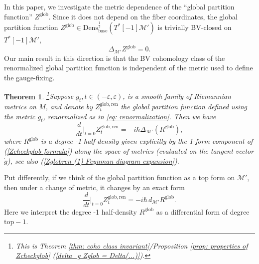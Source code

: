 \documentclass[11pt,a4paper]{amsart}
\theoremstyle{plain} %
\newtheorem{thm}{Theorem}[section]
\theoremstyle{definition}
\theoremstyle{remark}
\newtheorem{rem}[thm]{Remark}
\newcommand{\mr}{\mathrm}
\newcommand{\M}{\mathcal{M}}
\begin{document}
In this paper, we investigate the metric dependence of the ``global partition function'' $Z^\mr{glob}$.  
Since it does not depend on the fiber coordinates, the global partition function $Z^\mr{glob} \in \mr{Dens}^{\frac12}_\mr{base}(T^*[-1]\M')$ is trivially BV-closed on $T^*[-1]\M'$, 
\begin{equation}
    \Delta_{\M'}Z^\mr{glob} = 0.
\end{equation}
Our main result in this direction is that the  BV cohomology class of the renormalized global partition function is independent of the metric used to define the gauge-fixing. 
\begin{thm}\footnote{
This is Theorem \ref{thm: coho class invariant}/Proposition \ref{prop: properties of Zcheckglob} (\ref{delta_g Zglob = Delta(...)}).
}\label{thm:metric dependence intro}
Suppose $g_t, t\in (-\varepsilon,\varepsilon)$, is a smooth family of Riemannian metrics on $M$, and denote by $Z_t^\mr{glob,ren}$ the global partition function defined using the metric $g_t$, renormalized as in \eqref{eq: renormalization}. Then we have 
\begin{equation}
    \frac{d}{dt}\bigg|_{t=0} Z_t^\mr{glob,ren} = -i\hbar\Delta_{\M'}(R^\mr{glob}),
\end{equation}
where $R^\mr{glob}$ is a degree -1 half-density given explicitly by the 1-form component of (\ref{Zcheckglob formula})  along the space of metrics (evaluated on the tangent vector $\dot{g}$), see also (\ref{Zglobren (1) Feynman diagram expansion}).
\end{thm}
Put differently, if we think of the global partition function as a top form on $\M'$, then under a change of metric, it changes by an exact form 
\begin{equation}
    \frac{d}{dt}\bigg|_{t=0} Z_t^\mr{glob,ren} = -i\hbar\, d_{\M'}R^\mr{glob}.
\end{equation}
Here we interpret the degree -1 half-density $R^{\mr{glob}}$ as a differential form of degree $\mr{top} -1$.  
\end{document}
